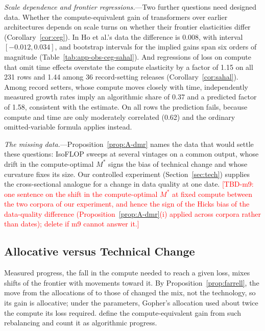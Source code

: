 

\emph{Scale dependence and frontier regressions.}---Two further questions need designed data. Whether the
compute-equivalent gain of transformers over earlier architectures depends on scale turns on whether their frontier
elasticities differ (Corollary~\ref{cor:ceg}). In Ho et al.'s data the difference is 0.008, with interval
$[-0.012,0.034]$, and bootstrap intervals for the implied gains span six orders of magnitude
(Table~\ref{tab:app-obs-ceg-sahal}). And regressions of loss on compute that omit time effects overstate the compute
elasticity by a factor of 1.15 on all 231 rows and 1.44 among 36 record-setting releases (Corollary~\ref{cor:sahal}).
Among record setters, whose compute moves closely with time, independently measured growth rates imply an algorithmic
share of 0.37 and a predicted factor of 1.58, consistent with the estimate. On all rows the prediction fails, because
compute and time are only moderately correlated (0.62) and the ordinary omitted-variable formula applies instead.



\emph{The missing data.}---Proposition~\ref{prop:A-dmr} names the data that would settle these questions: IsoFLOP
sweeps at several vintages on a common output, whose drift in the compute-optimal $M^*$ signs the bias of technical
change and whose curvature fixes its size. Our controlled experiment (Section~\ref{sec:tech}) supplies the
cross-sectional analogue for a change in data quality at one date.
\textcolor{red}{[TBD-m9: one sentence on the shift in the compute-optimal $M^*$ at fixed compute between the two
corpora of our experiment, and hence the sign of the Hicks bias of the data-quality difference
(Proposition~\ref{prop:A-dmr}(i) applied across corpora rather than dates); delete if m9 cannot answer it.]}

\subsection{Allocative versus Technical Change}\label{app:obs-allocative}

Measured progress, the fall in the compute needed to reach a given loss, mixes shifts of the frontier with movements
toward it. By Proposition~\ref{prop:farrell}, the move from the allocations of \citet{kaplan2020scaling} to those of
\citet{hoffmann2022training} changed the mix, not the technology, so its gain is allocative; under the
\citet{besiroglu2024chinchilla} parameters, Gopher's allocation used about twice the compute its loss required.
\citet{gundlach2025origin} define the compute-equivalent gain from such rebalancing and count it as algorithmic
progress.

